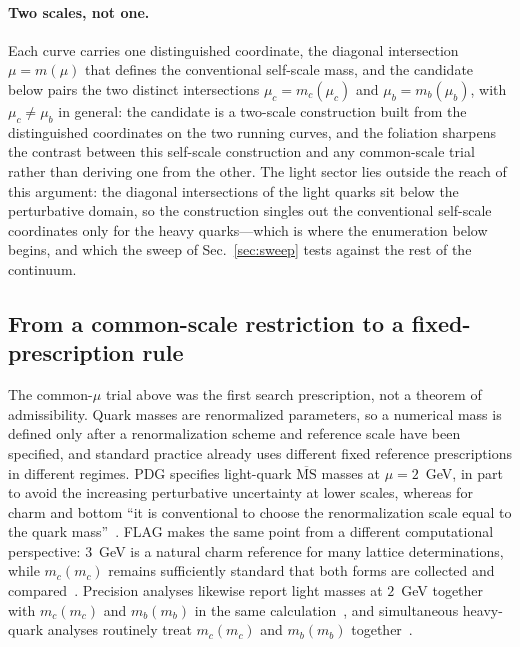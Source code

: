 \documentclass[aps,twocolumn,superscriptaddress,nofootinbib,floatfix]{revtex4-2}
\newcommand{\MSbar}{\overline{\mathrm{MS}}}
\begin{document}
\paragraph{Two scales, not one.}
Each curve carries one distinguished coordinate, the diagonal intersection $\mu=m(\mu)$ that defines the conventional self-scale mass, and the candidate below pairs the two distinct intersections $\mu_c=m_c(\mu_c)$ and $\mu_b=m_b(\mu_b)$, with $\mu_c\neq\mu_b$ in general: the candidate is a two-scale construction built from the distinguished coordinates on the two running curves, and the foliation sharpens the contrast between this self-scale construction and any common-scale trial rather than deriving one from the other. The light sector lies outside the reach of this argument: the diagonal intersections of the light quarks sit below the perturbative domain, so the construction singles out the conventional self-scale coordinates only for the heavy quarks---which is where the enumeration below begins, and which the sweep of Sec.~\ref{sec:sweep} tests against the rest of the continuum.

\subsection{From a common-scale restriction to a fixed-prescription rule}

The common-$\mu$ trial above was the first search prescription, not a theorem of admissibility. Quark masses are renormalized parameters, so a numerical mass is defined only after a renormalization scheme and reference scale have been specified, and standard practice already uses different fixed reference prescriptions in different regimes. PDG specifies light-quark $\MSbar$ masses at $\mu=2$~GeV, in part to avoid the increasing perturbative uncertainty at lower scales, whereas for charm and bottom ``it is conventional to choose the renormalization scale equal to the quark mass''~\cite{PDG2026}. FLAG makes the same point from a different computational perspective: $3$~GeV is a natural charm reference for many lattice determinations, while $m_c(m_c)$ remains sufficiently standard that both forms are collected and compared~\cite{FLAG2024}. Precision analyses likewise report light masses at $2$~GeV together with $m_c(m_c)$ and $m_b(m_b)$ in the same calculation~\cite{Bazavov2018Masses}, and simultaneous heavy-quark analyses routinely treat $m_c(m_c)$ and $m_b(m_b)$ together~\cite{ErlerLuo2003,KomijaniPetreczkyWeber2020}.
\end{document}
